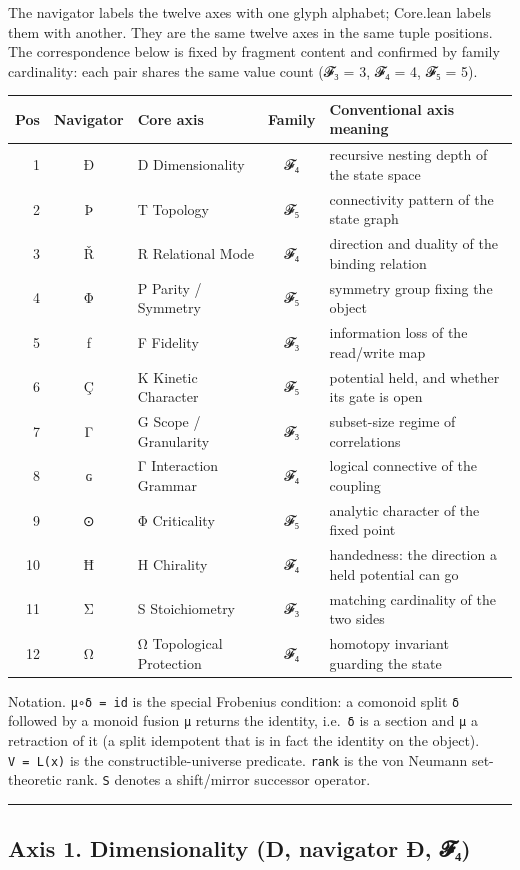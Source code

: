 \documentclass[12pt,a4paper]{article}
\begin{document}
The navigator labels the twelve axes with one glyph alphabet; Core.lean
labels them with another. They are the same twelve axes in the same
tuple positions. The correspondence below is fixed by fragment content
and confirmed by family cardinality: each pair shares the same value
count (𝓕₃ = 3, 𝓕₄ = 4, 𝓕₅ = 5).

\begin{longtable}[]{@{}rclcl@{}}
\toprule
Pos & Navigator & Core axis & Family & Conventional axis
meaning\tabularnewline
\midrule
\endhead
1 & Ð & D Dimensionality & 𝓕₄ & recursive nesting depth of the state
space\tabularnewline
2 & Þ & T Topology & 𝓕₅ & connectivity pattern of the state
graph\tabularnewline
3 & Ř & R Relational Mode & 𝓕₄ & direction and duality of the binding
relation\tabularnewline
4 & Φ & P Parity / Symmetry & 𝓕₅ & symmetry group fixing the
object\tabularnewline
5 & ƒ & F Fidelity & 𝓕₃ & information loss of the read/write
map\tabularnewline
6 & Ç & K Kinetic Character & 𝓕₅ & potential held, and whether its gate
is open\tabularnewline
7 & Γ & G Scope / Granularity & 𝓕₃ & subset-size regime of
correlations\tabularnewline
8 & ɢ & Γ Interaction Grammar & 𝓕₄ & logical connective of the
coupling\tabularnewline
9 & ⊙ & Φ Criticality & 𝓕₅ & analytic character of the fixed
point\tabularnewline
10 & Ħ & H Chirality & 𝓕₄ & handedness: the direction a held potential
can go\tabularnewline
11 & Σ & S Stoichiometry & 𝓕₃ & matching cardinality of the two
sides\tabularnewline
12 & Ω & Ω Topological Protection & 𝓕₄ & homotopy invariant guarding the
state\tabularnewline
\bottomrule
\end{longtable}

Notation. \texttt{μ∘δ\ =\ id} is the special Frobenius condition: a
comonoid split \texttt{δ} followed by a monoid fusion \texttt{μ} returns
the identity, i.e.~\texttt{δ} is a section and \texttt{μ} a retraction
of it (a split idempotent that is in fact the identity on the object).
\texttt{V\ =\ L(x)} is the constructible-universe predicate.
\texttt{rank} is the von Neumann set-theoretic rank. \texttt{S} denotes
a shift/mirror successor operator.

\begin{center}\rule{0.5\linewidth}{0.5pt}\end{center}

\hypertarget{axis-1.-dimensionality-d-navigator-uxf0-ux1d4d5ux2084}{%
\subsection{Axis 1. Dimensionality (D, navigator Ð,
𝓕₄)}\label{axis-1.-dimensionality-d-navigator-uxf0-ux1d4d5ux2084}}
\end{document}
